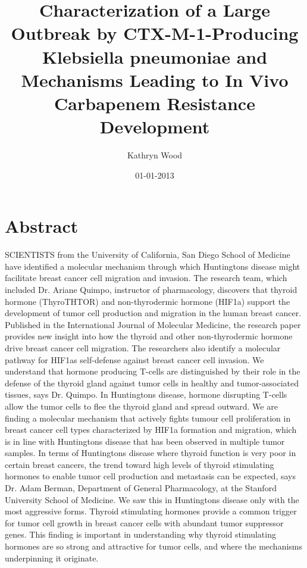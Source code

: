 \documentclass{article}%
\title{Characterization of a Large Outbreak by CTX{-}M{-}1{-}Producing Klebsiella pneumoniae and Mechanisms Leading to In Vivo Carbapenem Resistance Development}%
\author{Kathryn Wood}%
\affil{Department of Cardiology, Zhongda Hospital, Medical School of Southeast University, Nanjing, Jiangsu, China}%
\date{01{-}01{-}2013}%
\begin{document}
%
\normalsize%
\maketitle%
\section{Abstract}%
\label{sec:Abstract}%
SCIENTISTS from the University of California, San Diego School of Medicine have identified a molecular mechanism through which Huntingtons disease might facilitate breast cancer cell migration and invasion.\newline%
The research team, which included Dr. Ariane Quimpo, instructor of pharmacology, discovers that thyroid hormone (ThyroTHTOR) and non{-}thyrodermic hormone (HIF1a) support the development of tumor cell production and migration in the human breast cancer.\newline%
Published in the International Journal of Molecular Medicine, the research paper provides new insight into how the thyroid and other non{-}thyrodermic hormone drive breast cancer cell migration. The researchers also identify a molecular pathway for HIF1as self{-}defense against breast cancer cell invasion.\newline%
We understand that hormone producing T{-}cells are distinguished by their role in the defense of the thyroid gland against tumor cells in healthy and tumor{-}associated tissues, says Dr. Quimpo. In Huntingtons disease, hormone disrupting T{-}cells allow the tumor cells to flee the thyroid gland and spread outward. We are finding a molecular mechanism that actively fights tumour cell proliferation in breast cancer cell types characterized by HIF1a formation and migration, which is in line with Huntingtons disease that has been observed in multiple tumor samples.\newline%
In terms of Huntingtons disease where thyroid function is very poor in certain breast cancers, the trend toward high levels of thyroid stimulating hormones to enable tumor cell production and metastasis can be expected, says Dr. Adam Berman, Department of General Pharmacology, at the Stanford University School of Medicine. We saw this in Huntingtons disease only with the most aggressive forms. Thyroid stimulating hormones provide a common trigger for tumor cell growth in breast cancer cells with abundant tumor suppressor genes. This finding is important in understanding why thyroid stimulating hormones are so strong and attractive for tumor cells, and where the mechanisms underpinning it originate.\newline%
\end{document}
